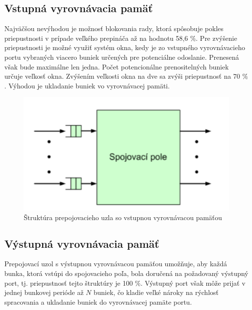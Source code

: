 \subsection{Vstupná vyrovnávacia pamäť}
Najväčšou nevýhodou je možnosť blokovania rady, ktorá spôsobuje pokles priepustnosti v prípade veľkého prepináča až na hodnotu 58,6 $\%$. Pre zvýšenie priepustnosti je možné využiť systém okna, kedy je zo vstupného vyrovnávacieho portu vybraných viacero buniek určených pre potenciálne odoslanie. Prenesená však bude maximálne len jedna. Počet potencionálne prenositelných buniek určuje veľkosť okna. Zvýšením veľkosti okna na dve sa zvýši priepustnosť na 70 $\%$. Výhodou je ukladanie buniek vo vyrovnávacej pamäti.

\begin{figure}[ht]
\centering
  \begin{center}
    \includegraphics[scale=0.8]{BPC-HWS/images/propoj_vstup.png}
  \end{center}
  \caption[Štruktúra prepojovacieho uzla so vstupnou vyrovnávacou pamäťou]{Štruktúra prepojovacieho uzla so vstupnou vyrovnávacou pamäťou}
\end{figure}

\subsection{Výstupná vyrovnávacia pamäť}
Prepojovací uzol s výstupnou vyrovnávacou pamäťou umožňuje, aby každá bunka, ktorá vstúpi do spojovacieho poľa, bola doručená na požadovaný výstupný port, tj. priepustnosť tejto štruktúry je 100 $\%$. Výstupný port však môže prijať v jednej bunkovej perióde až $N$ buniek, čo kladie veľké nároky na rýchlosť spracovania a ukladanie buniek do vyrovnávacej pamäte portu.

